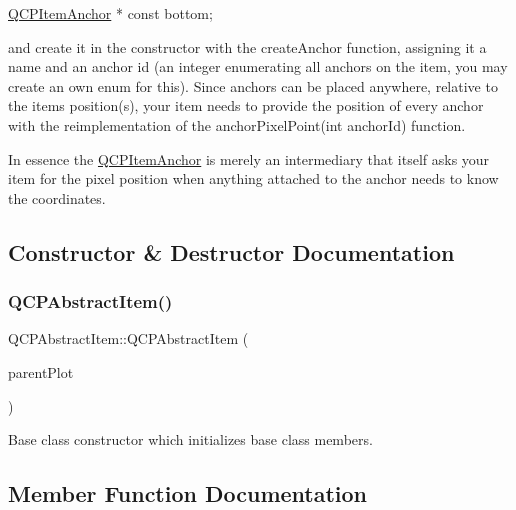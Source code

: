 \begin{DoxyCode}
\mbox{\hyperlink{class_q_c_p_item_anchor}{QCPItemAnchor}} * \textcolor{keyword}{const} bottom;
\end{DoxyCode}


and create it in the constructor with the create\+Anchor function, assigning it a name and an anchor id (an integer enumerating all anchors on the item, you may create an own enum for this). Since anchors can be placed anywhere, relative to the item\textquotesingle{}s position(s), your item needs to provide the position of every anchor with the reimplementation of the anchor\+Pixel\+Point(int anchor\+Id) function.

In essence the \mbox{\hyperlink{class_q_c_p_item_anchor}{Q\+C\+P\+Item\+Anchor}} is merely an intermediary that itself asks your item for the pixel position when anything attached to the anchor needs to know the coordinates. 

\subsection{Constructor \& Destructor Documentation}
\mbox{\label{class_q_c_p_abstract_item_a9922507d8b4503a1fe1ed0b1030e23b6}} 
\subsubsection{\texorpdfstring{Q\+C\+P\+Abstract\+Item()}{QCPAbstractItem()}}
{\footnotesize\ttfamily Q\+C\+P\+Abstract\+Item\+::\+Q\+C\+P\+Abstract\+Item (\begin{DoxyParamCaption}\item[{\mbox{\hyperlink{class_q_custom_plot}{Q\+Custom\+Plot}} $\ast$}]{parent\+Plot }\end{DoxyParamCaption})}

Base class constructor which initializes base class members. 

\subsection{Member Function Documentation}
\mbox{\label{class_q_c_p_abstract_item_a139c255ea8831642fac91748e29a5adb}} 
